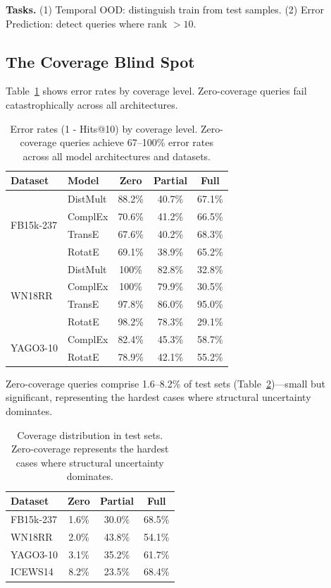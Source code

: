 \documentclass{article}
\begin{document}
\textbf{Tasks.} (1) Temporal OOD: distinguish train from test samples. (2) Error Prediction: detect queries where rank $> 10$.

\subsection{The Coverage Blind Spot}

Table~\ref{tab:error_rates} shows error rates by coverage level. Zero-coverage queries fail catastrophically across all architectures.

\begin{table}[htbp]
\centering
\caption{Error rates (1 - Hits@10) by coverage level. Zero-coverage queries achieve 67--100\% error rates across all model architectures and datasets.}
\label{tab:error_rates}
\begin{tabular}{llccc}
\toprule
Dataset & Model & Zero & Partial & Full \\
\midrule
\multirow{4}{*}{FB15k-237}
& DistMult & 88.2\% & 40.7\% & 67.1\% \\
& ComplEx & 70.6\% & 41.2\% & 66.5\% \\
& TransE & 67.6\% & 40.2\% & 68.3\% \\
& RotatE & 69.1\% & 38.9\% & 65.2\% \\
\midrule
\multirow{4}{*}{WN18RR}
& DistMult & 100\% & 82.8\% & 32.8\% \\
& ComplEx & 100\% & 79.9\% & 30.5\% \\
& TransE & 97.8\% & 86.0\% & 95.0\% \\
& RotatE & 98.2\% & 78.3\% & 29.1\% \\
\midrule
\multirow{2}{*}{YAGO3-10}
& ComplEx & 82.4\% & 45.3\% & 58.7\% \\
& RotatE & 78.9\% & 42.1\% & 55.2\% \\
\bottomrule
\end{tabular}
\end{table}

Zero-coverage queries comprise 1.6--8.2\% of test sets (Table~\ref{tab:coverage_dist})---small but significant, representing the hardest cases where structural uncertainty dominates.

\begin{table}[htbp]
\centering
\caption{Coverage distribution in test sets. Zero-coverage represents the hardest cases where structural uncertainty dominates.}
\label{tab:coverage_dist}
\begin{tabular}{lccc}
\toprule
Dataset & Zero & Partial & Full \\
\midrule
FB15k-237 & 1.6\% & 30.0\% & 68.5\% \\
WN18RR & 2.0\% & 43.8\% & 54.1\% \\
YAGO3-10 & 3.1\% & 35.2\% & 61.7\% \\
ICEWS14 & 8.2\% & 23.5\% & 68.4\% \\
\bottomrule
\end{tabular}
\end{table}
\end{document}
